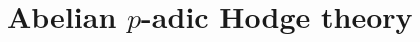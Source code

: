 \chapter{Abelian \texorpdfstring{$p$}{}-adic Hodge theory}
    \begin{abstract}
        
    \end{abstract}
    
    \minitoc
    
    
    
    
    
    